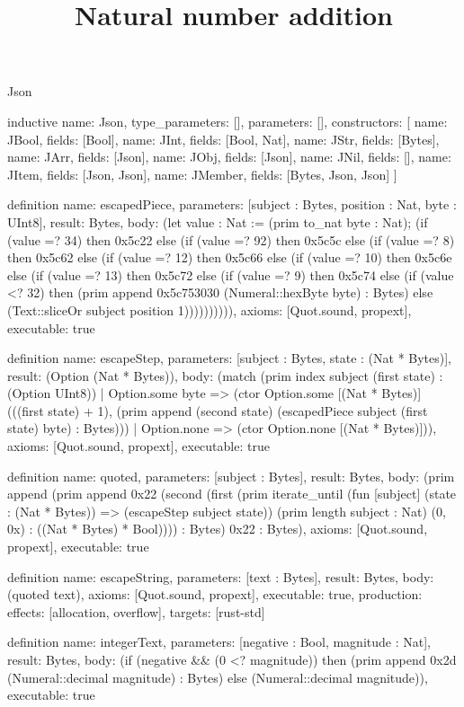\begin{lexlean}{Json}
\title{Natural number addition}
\begin{semanticmodule}
inductive{
  name: Json,
  type_parameters: [],
  parameters: [],
  constructors: [
    {name: JBool, fields: [Bool]},
    {name: JInt, fields: [Bool, Nat]},
    {name: JStr, fields: [Bytes]},
    {name: JArr, fields: [Json]},
    {name: JObj, fields: [Json]},
    {name: JNil, fields: []},
    {name: JItem, fields: [Json, Json]},
    {name: JMember, fields: [Bytes, Json, Json]}
  ]
}

definition{
  name: escapedPiece,
  parameters: [subject : Bytes, position : Nat, byte : UInt8],
  result: Bytes,
  body: (let value : Nat := (prim to_nat byte : Nat); (if (value =? 34) then 0x5c22 else (if (value =? 92) then 0x5c5c else (if (value =? 8) then 0x5c62 else (if (value =? 12) then 0x5c66 else (if (value =? 10) then 0x5c6e else (if (value =? 13) then 0x5c72 else (if (value =? 9) then 0x5c74 else (if (value <? 32) then (prim append 0x5c753030 (Numeral::hexByte byte) : Bytes) else (Text::sliceOr subject position 1)))))))))),
  axioms: [Quot.sound, propext],
  executable: true
}

definition{
  name: escapeStep,
  parameters: [subject : Bytes, state : (Nat * Bytes)],
  result: (Option (Nat * Bytes)),
  body: (match (prim index subject (first state) : (Option UInt8))
    | Option.some byte => (ctor Option.some [(Nat * Bytes)] (((first state) + 1), (prim append (second state) (escapedPiece subject (first state) byte) : Bytes)))
    | Option.none => (ctor Option.none [(Nat * Bytes)])),
  axioms: [Quot.sound, propext],
  executable: true
}

definition{
  name: quoted,
  parameters: [subject : Bytes],
  result: Bytes,
  body: (prim append (prim append 0x22 (second (first (prim iterate_until (fun [subject] (state : (Nat * Bytes)) => (escapeStep subject state)) (prim length subject : Nat) (0, 0x) : ((Nat * Bytes) * Bool)))) : Bytes) 0x22 : Bytes),
  axioms: [Quot.sound, propext],
  executable: true
}

definition{
  name: escapeString,
  parameters: [text : Bytes],
  result: Bytes,
  body: (quoted text),
  axioms: [Quot.sound, propext],
  executable: true,
  production: {effects: [allocation, overflow], targets: [rust-std]}
}

definition{
  name: integerText,
  parameters: [negative : Bool, magnitude : Nat],
  result: Bytes,
  body: (if (negative && (0 <? magnitude)) then (prim append 0x2d (Numeral::decimal magnitude) : Bytes) else (Numeral::decimal magnitude)),
  executable: true
}


\end{semanticmodule}
\end{lexlean}
